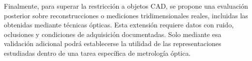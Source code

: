 Finalmente, para superar la restricción a objetos CAD, se propone una evaluación posterior sobre reconstrucciones o mediciones tridimensionales reales, incluidas las obtenidas mediante técnicas ópticas. Esta extensión requiere datos con ruido, oclusiones y condiciones de adquisición documentadas. Solo mediante esa validación adicional podrá establecerse la utilidad de las representaciones estudiadas dentro de una tarea específica de metrología óptica.

